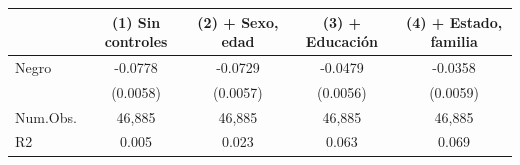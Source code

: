 \begin{table}
\centering
\begin{tabular}[t]{lcccc}
\toprule
  & (1) Sin controles & (2) + Sexo, edad & (3) + Educación & (4) + Estado, familia\\
\midrule
Negro & -0.0778 & -0.0729 & -0.0479 & -0.0358\\
 & (0.0058) & (0.0057) & (0.0056) & (0.0059)\\
\midrule
Num.Obs. & 46,885 & 46,885 & 46,885 & 46,885\\
R2 & 0.005 & 0.023 & 0.063 & 0.069\\
\bottomrule
\end{tabular}
\end{table}
